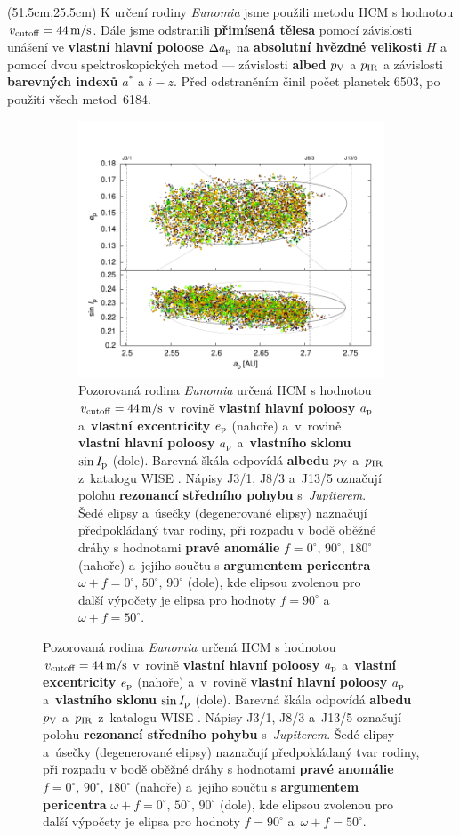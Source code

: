 \documentclass{beamer}
\newlength{\vyska}
\newlength{\vyskaB}
\newlength{\main}
\begin{document}
\begin{frame}
\begin{columns}[t]
\begin{column}{\main}
\begin{tcolorbox}[title=Výsledky\phantom{Úy},height=\vyskaB]
	\vspace{-1cm}
	\begin{textblock*}{35cm}(51.5cm,25.5cm) %
		K určení rodiny \textit{Eunomia} jsme použili metodu HCM s hodnotou $v_{\rm cutoff}=44\,{\rm m/s}$. Dále jsme odstranili \textbf{přimísená tělesa} pomocí závislosti unášení ve \textbf{vlastní hlavní poloose} $\Delta a_{\rm p}$ na \textbf{absolutní hvězdné velikosti} $H$ a pomocí dvou spektroskopických metod --- závislosti \textbf{albed} $p_{\rm V}$ a $p_{\rm IR}$ a závislosti \textbf{barevných indexů} $a^*$ a $i-z$. Před odstraněním činil počet planetek 6503, po použití všech metod~6184.
	\end{textblock*}
	\begin{figure}[!htb]
		\begin{subfigure}[b]{0.3\textwidth}
			\centering
			\includegraphics[width=1.0\textwidth]{../obr/ae_ai_wise}
			\caption{Pozorovaná rodina \textit{Eunomia} určená HCM s hodnotou $v_{\rm cutoff} = 44\,{\rm m/s}$ v~rovině \textbf{vlastní hlavní poloosy} $a_{\rm p}$ a~\textbf{vlastní excentricity} $e_{\rm p}$ (nahoře) a~v~rovině \textbf{vlastní hlavní poloosy} $a_{\rm p}$ a~\textbf{vlastního sklonu} $\sin I_{\rm p}$ (dole). Barevná škála odpovídá \textbf{albedu} $p_{\rm V}$ a~$p_{\rm IR}$ z~katalogu WISE \cite{nugent15}. Nápisy J3/1, J8/3 a~J13/5 označují polohu \textbf{rezonancí středního pohybu} s~\textit{Jupiterem}. Šedé elipsy a~úsečky (degenerované elipsy) naznačují předpokládaný tvar rodiny, při rozpadu v bodě oběžné dráhy s hodnotami \textbf{pravé anomálie} $f=0^\circ,\,90^\circ,\,180^\circ$ (nahoře) a~jejího součtu s \textbf{argumentem pericentra} $\omega+f=0^\circ,\, 50^\circ,\, 90^\circ$ (dole), kde elipsou zvolenou pro další výpočety je elipsa pro hodnoty $f=90^\circ$ a~$\omega+f=50^\circ$.}

\end{subfigure}
\end{figure}
\end{tcolorbox}
\end{column}
\end{columns}
\end{frame}
\end{document}
